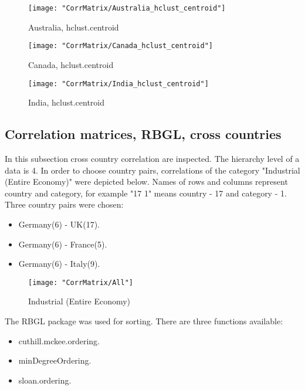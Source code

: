 \documentclass[a4paper]{article}
\begin{document}
\begin{figure}[H]
\begin{center}
\texttt{[image: "CorrMatrix/Australia\_hclust\_centroid"]}
\caption{Australia,  hclust.centroid}
\label{fig:2}
\end{center}
\end{figure}

\begin{figure}[H]
\begin{center}
\texttt{[image: "CorrMatrix/Canada\_hclust\_centroid"]}
\caption{Canada,  hclust.centroid}
\label{fig:2}
\end{center}
\end{figure}

\begin{figure}[H]
\begin{center}
\texttt{[image: "CorrMatrix/India\_hclust\_centroid"]}
\caption{India,  hclust.centroid}
\label{fig:2}
\end{center}
\end{figure}

\subsection{Correlation matrices,  RBGL,  cross countries}
In this subsection cross country correlation are inspected. The
hierarchy level of a data is 4. In order to choose
country pairs, correlations of the category "Industrial (Entire
Economy)" were depicted below. Names of rows and columns represent
country and category, for example "17 1"  means country - 17 and
category - 1. Three country pairs were chosen:

\begin{itemize}
\item Germany(6) - UK(17).
\item Germany(6) - France(5).
\item Germany(6) - Italy(9).
\end{itemize}

\begin{figure}[H]
\begin{center}
\texttt{[image: "CorrMatrix/All"]}
\caption{Industrial (Entire Economy)}
\label{fig:2}
\end{center}
\end{figure}


The RBGL package was used for sorting. There are three functions available:
\begin{itemize}
\item cuthill.mckee.ordering.
\item minDegreeOrdering.
\item sloan.ordering.
\end{itemize}
\end{document}
